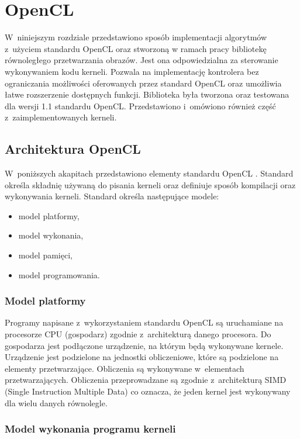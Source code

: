 \chapter{OpenCL}
\label{cha:opencl}

W~niniejszym rozdziale przedstawiono sposób implementacji algorytmów z~użyciem standardu OpenCL oraz stworzoną w ramach pracy bibliotekę równoległego przetwarzania obrazów. Jest ona odpowiedzialna za sterowanie wykonywaniem kodu kerneli. Pozwala na implementację kontrolera bez ograniczania możliwości oferowanych przez standard OpenCL oraz umożliwia łatwe rozszerzenie dostępnych funkcji. Biblioteka była tworzona oraz testowana dla wersji 1.1 standardu OpenCL. Przedstawiono i~omówiono również część z~zaimplementowanych kerneli.

\section{Architektura OpenCL}
\label{sec:architekturaOpenCL}

W~poniższych akapitach przedstawiono elementy standardu OpenCL \cite{OpenCLspecification}. Standard określa składnię używaną do pisania kerneli oraz definiuje sposób kompilacji oraz wykonywania kerneli. Standard określa następujące modele:
\begin{itemize}
\item model platformy,
\item model wykonania,
\item model pamięci,
\item model programowania.
\end{itemize}

\subsection{Model platformy}
\label{platformModel}

Programy napisane z~wykorzystaniem standardu OpenCL są uruchamiane na procesorze CPU (gospodarz) zgodnie z~architekturą danego procesora. Do gospodarza jest podłączone urządzenie, na którym będą wykonywane kernele. Urządzenie jest podzielone na jednostki obliczeniowe, które są podzielone na elementy przetwarzające. Obliczenia są wykonywane w~elementach przetwarzających. Obliczenia przeprowadzane są zgodnie z~architekturą SIMD (Single Instruction Multiple Data) co oznacza, że jeden kernel jest wykonywany dla wielu danych równolegle.

\subsection{Model wykonania programu kerneli}
\label{executionModel}

